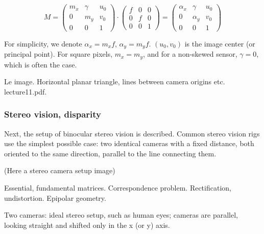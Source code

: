 \begin{equation}
	M =
	\begin{pmatrix}
		m_x & \gamma & u_0\\
		0   &    m_y & v_0\\
		0   &        0 & 1
	\end{pmatrix}
\cdot
	\begin{pmatrix}
		f & 0 & 0\\
		0 & f & 0\\
		0 & 0 & 1
	\end{pmatrix}
	=
	\begin{pmatrix}
		\alpha_x & \gamma   & u_0\\
		0        & \alpha_y & v_0\\
		0        & 0        & 1
	\end{pmatrix}
\end{equation}

For simplicity, we denote $\alpha_x = m_x f$, $\alpha_y = m_y f$. $(u_0, v_0)$ is the image center (or principal point). For square pixels, $m_x = m_y$, and for a non-skewed sensor, $\gamma = 0$, which is often the case.

Le image. Horizontal planar triangle, lines between camera origins etc. lecture11.pdf.

\subsubsection{Stereo vision, disparity}

Next, the setup of binocular stereo vision is described. Common stereo vision rigs use the simplest possible case: two identical cameras with a fixed distance, both oriented to the same direction, parallel to the line connecting them.

(Here a stereo camera setup image)

Essential, fundamental matrices. Correspondence problem. Rectification, undistortion. Epipolar geometry.

Two cameras: ideal stereo setup, such as human eyes; cameras are parallel, looking straight and shifted only in the x (or y) axis.


